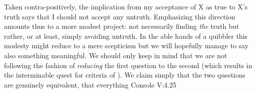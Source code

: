 Taken contra-positively, the implication from my acceptance of X as true to X's
truth says that I should not accept any untruth.  Emphasizing this direction
amounts thus to a more modest project: not necessarily finding {\em the} truth
but rather, or at least, simply avoiding untruth. In the able hands of a
quibbler this modesty might reduce to a mere scepticism but we will hopefully
manage to say also something meaningful.  We should only keep in mind that we
are not following the fashion of {\em reducing} the first question to the second
(which results in the interminable quest for  criteria of
). We claim simply that the two questions are genuinely
equivalent, that everything \citet{that is known, is comprehended not according
  to its own force, but rather according to the nature of those who know
  it.}{Console}{ V:4.25} 

